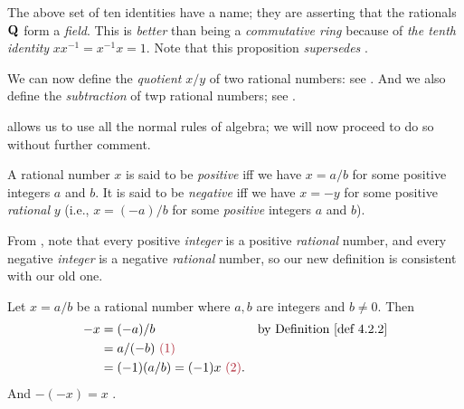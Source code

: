 \begin{remark} \label{remark 4.2.5}
The above set of ten identities have a name; they are asserting that the rationals \(\mathbf{Q}\) form a \emph{field}.
This is \emph{better} than being a \emph{commutative ring} because of \emph{the tenth identity} \(xx^{-1} = x^{-1}x = 1\).
Note that this proposition \emph{supersedes} .
\end{remark}

We can now define the \emph{quotient} \(x / y\) of two rational numbers: see . And we also define the \emph{subtraction} of twp rational numbers; see .

\begin{note}
 allows us to use all the normal rules of algebra; we will now proceed to do so without further comment.
\end{note}

\begin{definition} \label{def 4.2.6}
A rational number \(x\) is said to be \emph{positive} iff we have \(x = a/b\) for some positive integers \(a\) and \(b\).
It is said to be \emph{negative} iff we have \(x = -y\) for some positive \emph{rational} \(y\) (i.e., \(x =(-a)/b\) for some \emph{positive} integers \(a\) and \(b\)).
\end{definition}

\begin{note}
From , note that every positive \emph{integer} is a positive \emph{rational} number,
and every negative \emph{integer} is a negative \emph{rational} number,
so our new definition is consistent with our old one.
\end{note}

\begin{additional corollary} \label{ac 4.2.3}
Let \(x = a / b\) be a rational number where \(a, b\) are integers and \(b \neq 0\).
Then
\begin{align*}
    -x & = (-a) / b & \text{by \DEF{4.2.2}} \\
       & = a / (-b) \MAROON{\ (1)} \\
       & = (-1)(a / b) = (-1)x \MAROON{\ (2)}.
\end{align*}
And \(-(-x) = x\) .
\end{additional corollary}

